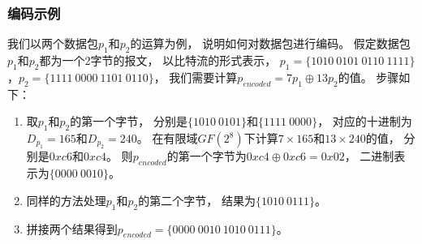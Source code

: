 \begin{frame}
	\frametitle{编码示例}
	我们以两个数据包$p_{1}$和$p_{2}$的运算为例，
	说明如何对数据包进行编码。
	假定数据包$p_{1}$和$p_{2}$都为一个2字节的报文，
	以比特流的形式表示，
	$p_{1}=\{1010\ 0101\ 0110\ 1111\}$，$p_{2}=\{1111\ 0000\ 1101\ 0110\}$，
	我们需要计算$p_{encoded}=7p_{1} \oplus 13p_{2}$的值。
	步骤如下：
	\begin{enumerate}[(1)]
		\item 取$p_{1}$和$p_{2}$的第一个字节，
		分别是$\{1010\ 0101\}$和$\{1111\ 0000\}$，
		对应的十进制为$D_{p_1}=165$和$D_{p_2}=240$。
		在有限域$GF(2^8)$下计算$7\times 165$和$13 \times 240$的值，
		分别是$0xc6$和$0xc4$。
		则$p_{encoded}$的第一个字节为$0xc4 \oplus 0xc6=0x02$，
		二进制表示为$\{0000\ 0010\}$。
		\item 同样的方法处理$p_{1}$和$p_{2}$的第二个字节，
		结果为$\{1010\ 0111\}$。
		\item 拼接两个结果得到$p_{encoded}=\{0000\ 0010\ 1010\ 0111\}$。
	\end{enumerate}
\end{frame}
